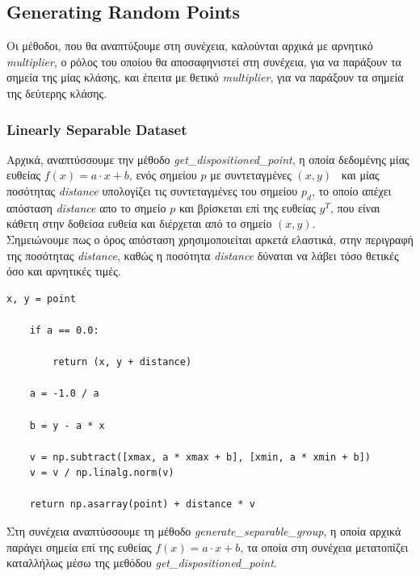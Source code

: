 \documentclass[12pt]{article}
\begin{document}
\subsection{Generating Random Points}

Οι μέθοδοι, που θα αναπτύξουμε στη συνέχεια, καλούνται αρχικά με αρνητικό \textit{multiplier},
ο ρόλος του οποίου θα αποσαφηνιστεί στη συνέχεια,
για να παράξουν τα σημεία της μίας κλάσης, και έπειτα με θετικό \textit{multiplier},
για να παράξουν τα σημεία της δεύτερης κλάσης. \\

\subsubsection{Linearly Separable Dataset}

Αρχικά, αναπτύσσουμε την μέθοδο \textit{get\_dispositioned\_point},
η οποία δεδομένης μίας ευθείας \( f(x) = a \cdot x + b \),
ενός σημείου \( p \) με συντεταγμένες \( (x, y) \) \ και
μίας ποσότητας \textit{distance} υπολογίζει τις συντεταγμένες του σημείου \( p_d \),
το οποίο απέχει απόσταση \textit{distance} απο το σημείο \( p \) και
βρίσκεται επί της ευθείας \( y^T \), που είναι κάθετη στην δοθείσα ευθεία και
διέρχεται από το σημείο \( (x, y) \). \\

Σημειώνουμε πως ο όρος απόσταση χρησιμοποιείται αρκετά ελαστικά,
στην περιγραφή της ποσότητας \textit{distance},
καθώς η ποσότητα \textit{distance} δύναται να λάβει τόσο θετικές όσο και αρνητικές τιμές. \\

\begin{lstlisting}[caption={Η μέθοδος \textit{get\_dispositioned\_point}}]
    x, y = point

    if a == 0.0:

        return (x, y + distance)

    a = -1.0 / a

    b = y - a * x

    v = np.subtract([xmax, a * xmax + b], [xmin, a * xmin + b])
    v = v / np.linalg.norm(v)

    return np.asarray(point) + distance * v
\end{lstlisting}

\pagebreak

Στη συνέχεια αναπτύσσουμε τη μέθοδο \textit{generate\_separable\_group},
η οποία αρχικά παράγει σημεία επί της ευθείας \( f(x) = a \cdot x + b \),
τα οποία στη συνέχεια μετατοπίζει καταλλήλως μέσω της μεθόδου \textit{get\_dispositioned\_point}. \\
\end{document}
